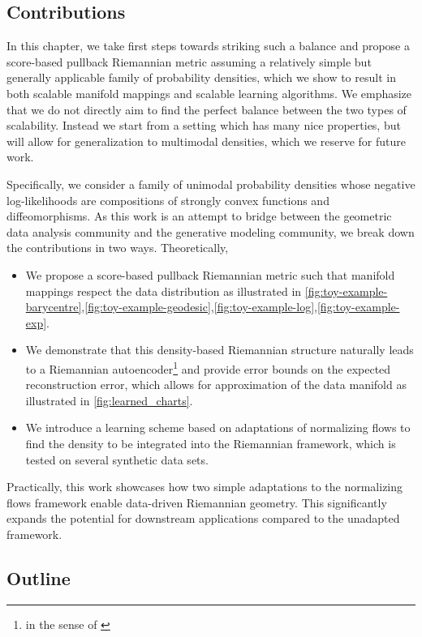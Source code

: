 \subsection{Contributions}

In this chapter, we take first steps towards striking such a balance and propose a score-based pullback Riemannian metric assuming a relatively simple but generally applicable family of probability densities, which we show to result in both scalable manifold mappings and scalable learning algorithms. We emphasize that we do not directly aim to find the perfect balance between the two types of scalability. Instead we start from a setting which has many nice properties, but will allow for generalization to multimodal densities, which we reserve for future work.

Specifically, we consider a family of unimodal probability densities whose negative log-likelihoods are compositions of strongly convex functions and diffeomorphisms. As this work is an attempt to bridge between the geometric data analysis community and the generative modeling community, we break down the contributions in two ways.
Theoretically,
\begin{itemize}
    \item We propose a score-based pullback Riemannian metric such that manifold mappings respect the data distribution as illustrated in \ref{fig:toy-example-barycentre},\ref{fig:toy-example-geodesic},\ref{fig:toy-example-log},\ref{fig:toy-example-exp}.
    \item We demonstrate that this density-based Riemannian structure naturally leads to a Riemannian autoencoder\footnote{in the sense of \cite{diepeveen2024pulling}} and provide error bounds on the expected reconstruction error, which allows for approximation of the data manifold as illustrated in \ref{fig:learned_charts}.
    \item We introduce a learning scheme based on adaptations of normalizing flows to find the density to be integrated into the Riemannian framework, which is tested on several synthetic data sets. 
\end{itemize}
Practically, this work showcases how two simple adaptations to the normalizing flows framework enable data-driven Riemannian geometry. This significantly expands the potential for downstream applications compared to the unadapted framework.

\subsection{Outline}

